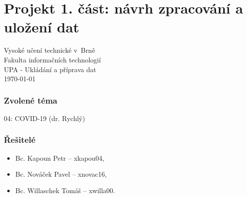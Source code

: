 \documentclass[11pt,a4paper,titlepage]{article}
\begin{document}


\part*{Projekt 1. část: návrh zpracování a uložení dat}
\begin{center}
Vysoké učení technické v~Brně\\
Fakulta informačních technologií\\
UPA - Ukládání a příprava dat\\
\today
\end{center}
\section{Zvolené téma}
04: COVID-19 (dr. Rychlý)
\section{Řešitelé}
\begin{itemize}
    \setlength\itemsep{0.3em}
    \item Bc. Kapoun Petr -- xkapou04,
    \item Bc. Nováček Pavel -- xnovac16,
    \item Bc. Willaschek Tomáš -- xwilla00.
\end{itemize}
\end{document}
